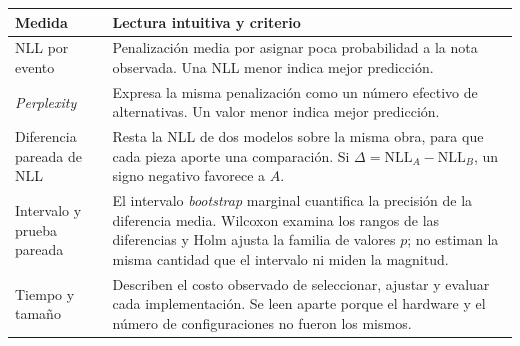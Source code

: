 \begin{tabular}{@{}p{2.4cm}p{8.2cm}@{}}
\hline
Medida & Lectura intuitiva y criterio \\
\hline
NLL por evento & Penalización media por asignar poca probabilidad a la nota observada. Una NLL menor indica mejor predicción. \\
\emph{Perplexity} & Expresa la misma penalización como un número efectivo de alternativas. Un valor menor indica mejor predicción. \\
Diferencia pareada de NLL & Resta la NLL de dos modelos sobre la misma obra, para que cada pieza aporte una comparación. Si $\Delta=\mathrm{NLL}_A-\mathrm{NLL}_B$, un signo negativo favorece a $A$. \\
Intervalo y prueba pareada & El intervalo \emph{bootstrap} marginal cuantifica la precisión de la diferencia media. Wilcoxon examina los rangos de las diferencias y Holm ajusta la familia de valores $p$; no estiman la misma cantidad que el intervalo ni miden la magnitud. \\
Tiempo y tamaño & Describen el costo observado de seleccionar, ajustar y evaluar cada implementación. Se leen aparte porque el hardware y el número de configuraciones no fueron los mismos. \\
\hline
\end{tabular}
